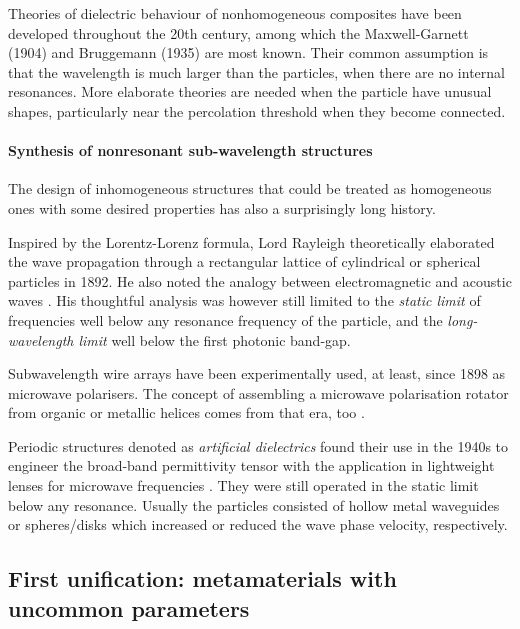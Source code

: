 Theories of dielectric behaviour of nonhomogeneous composites have been developed throughout the 20th century, among which the Maxwell-Garnett (1904) and Bruggemann (1935) are most known. Their common assumption is that the wavelength is much larger than the particles, when there are no internal resonances. More elaborate theories are needed when the particle have unusual shapes, particularly near the percolation threshold when they become connected.

\paragraph{Synthesis of nonresonant sub-wavelength structures} %
The design of inhomogeneous structures that could be treated as homogeneous ones with some desired properties has also a surprisingly long history. 

Inspired by the Lorentz-Lorenz formula, Lord Rayleigh theoretically elaborated the wave propagation through a rectangular lattice of cylindrical or spherical particles in 1892. He also noted the analogy between electromagnetic and acoustic waves \cite[p. 498]{rayleigh1892}. His thoughtful analysis was however still limited to the \textit{static limit} of frequencies well below any resonance frequency of the particle, and the \textit{long-wavelength limit} well below the first photonic band-gap. 

Subwavelength wire arrays have been experimentally used, at least, since 1898 as microwave polarisers. The concept of assembling a microwave polarisation rotator from organic or metallic helices comes from that era, too \cite{bose1898rotation, emerson}.

Periodic structures denoted as \textit{artificial dielectrics} \cite{brown1955properties} found their use in the 1940s to engineer the broad-band permittivity tensor with the application in lightweight lenses for microwave frequencies \cite{kock1948metallic}. They were still operated in the static limit below any resonance. Usually the particles consisted of hollow metal waveguides or spheres/disks which increased or reduced the wave phase velocity, respectively. 


\subsection{First unification: metamaterials with uncommon parameters} 
